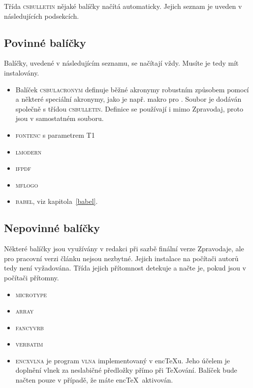 \documentclass{csbulletin}
\let\pkg\textsc
\begin{document}
Třída \pkg{csbulletin} nějaké balíčky načítá automaticky. Jejich seznam je uveden v následujících
podsekcích.

\subsection{Povinné balíčky}
Balíčky, uvedené v následujícím seznamu, se načítají vždy. Musíte je tedy mít instalovány.

\begin{itemize}
\item Balíček \pkg{csbulacronym} definuje běžné akronymy robustním způsobem pomocí  a
některé speciální akronymy, jako je např. makro  pro \cstug. Soubor je dodáván společně s
třídou \pkg{csbulletin}. Definice se používají i mimo Zpravodaj, proto jsou v samostatném souboru.

\item \pkg{fontenc} s parametrem T1

\item \pkg{lmodern}

\item \pkg{ifpdf}

\item \pkg{mflogo}

\item \pkg{babel}, viz kapitola~\ref{babel}.
\end{itemize}

\subsection{Nepovinné balíčky}
Některé balíčky jsou využívány v redakci při sazbě finální verze Zpravodaje, ale pro pracovní verzi
článku nejsou nezbytné. Jejich instalace na počítači autorů tedy není vyžadována. Třída jejich
přítomnost detekuje a načte je, pokud jsou v počítači přítomny.

\begin{itemize}
\item \pkg{microtype}

\item \pkg{array}

\item \pkg{fancyvrb}

\item \pkg{verbatim}

\item \pkg{encxvlna} je program \pkg{vlna} implementovaný v enc\TeX u. Jeho účelem je doplnění
vlnek za neslabičné předložky přímo při \TeX ování. Balíček bude načten pouze v případě, že máte
enc\TeX\ aktivován.
\end{itemize}
\end{document}
